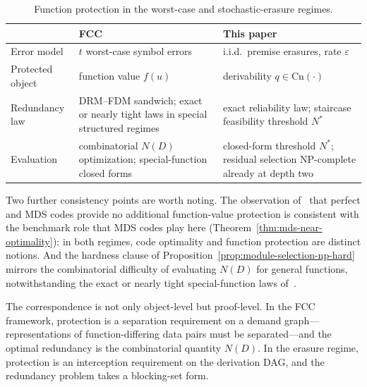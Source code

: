 \documentclass[journal]{IEEEtran}
\newcommand{\Cn}{\text{Cn}}
\numberwithin{equation}{section}
\begin{document}
\begin{table}[t]
\caption{Function protection in the worst-case and stochastic-erasure
regimes.}
\label{tab:regime-contrast}
\centering\footnotesize
\begin{tabularx}{\columnwidth}{@{}p{}LL@{}}
\toprule
 & FCC~\cite{lenz2023function,rajput2026function} & This paper \\
\midrule
Error model & \(t\) worst-case symbol errors & i.i.d.\ premise erasures,
rate \(\varepsilon\) \\
Protected object & function value \(f(u)\) & derivability
\(q\in\Cn(\cdot)\) \\
Redundancy law & DRM--FDM sandwich; exact or nearly tight laws in
special structured regimes & exact reliability law; staircase feasibility
threshold \(N^{*}\) \\
Evaluation & combinatorial \(N(D)\) optimization; special-function closed
forms & closed-form threshold \(N^{*}\); residual selection NP-complete
already at depth two \\
\bottomrule
\end{tabularx}
\end{table}

Two further consistency points are worth noting.  The observation
of~\cite{rajput2026function} that perfect and MDS codes provide no
additional function-value protection is consistent with the benchmark role
that MDS codes play here (Theorem~\ref{thm:mds-near-optimality}): in both
regimes, code optimality and function protection are distinct notions.
And the hardness clause of Proposition~\ref{prop:module-selection-np-hard}
mirrors the combinatorial difficulty of evaluating \(N(D)\) for general
functions, notwithstanding the exact or nearly tight special-function laws
of~\cite{zhang2025optimal,ly2025redundancy}.

The correspondence is not only object-level but proof-level.  In the FCC
framework, protection is a separation requirement on a demand
graph---representations of function-differing data pairs must be
separated---and the optimal redundancy is the combinatorial quantity
\(N(D)\).  In the erasure regime, protection is an interception
requirement on the derivation DAG, and the redundancy problem takes a
blocking-set form.
\end{document}
